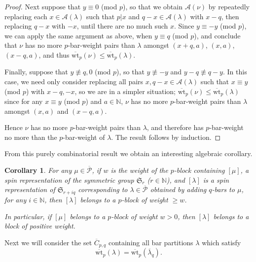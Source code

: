 \documentclass[10pt]{amsart}
\newtheorem{coro}[prop]{Corollary}
\begin{document}
\begin{proof}
Next suppose that $y\equiv0$ (mod $p$), so that we obtain $\mathcal{A}(\nu)$ by repeatedly replacing each $x\in\mathcal{A}(\lambda)$ such that $p|x$ and $q-x\in\mathcal{A}(\lambda)$ with $x-q$, then replacing $q-x$ with $-x$, until there are no much such $x$. Since $y\equiv-y$ (mod $p$), we can apply the same argument as above, when $y\equiv q$ (mod $p$), and conclude that $\nu$ has no more $p$-bar-weight pairs than $\lambda$ amongst $(x+q,a)$, $(x,a)$, $(x-q,a)$, and thus $\overline{\text{wt}}_p(\nu)\leq\overline{\text{wt}}_p(\lambda)$. 

Finally, suppose that $y\not\equiv q,0$ (mod $p$), so that $y\not\equiv-y$ and $y-q\not\equiv q-y$. In this case, we need only consider replacing all pairs $x,q-x\in\mathcal{A}(\lambda)$ such that $x\equiv y$ (mod $p$) with $x-q,-x$, so we are in a simpler situation; $\overline{\text{wt}}_p(\nu)\leq\overline{\text{wt}}_p(\lambda)$ since for any $x\equiv y$ (mod $p$) and $a\in\mathbb{N}$, $\nu$ has no more $p$-bar-weight pairs than $\lambda$ amongst $(x,a)$ and $(x-q,a)$.

Hence $\nu$ has no more $p$-bar-weight pairs than $\lambda$, and therefore has $p$-bar-weight no more than the $p$-bar-weight of $\lambda$. The result follows by induction.
\end{proof}

From this purely combinatorial result we obtain an interesting algebraic corollary. 

\begin{coro}For any $\mu\in\overline{\mathcal{P}}$, if $w$ is the weight of the $p$-block containing $[\mu]$, a spin representation of the symmetric group $\mathfrak{S}_r$ ($r\in\mathbb{N}$), and $[\lambda]$ is a spin representation of $\mathfrak{S}_{r+iq}$ corresponding to $\lambda\in\overline{\mathcal{P}}$ obtained by adding $q$-bars to $\mu$, for any $i\in\mathbb{N}$, then $[\lambda]$ belongs to a $p$-block of weight $\geq w$. 

In particular, if $[\mu]$ belongs to a $p$-block of weight $w>0$, then $[\lambda]$ belongs to a block of positive weight. 
\end{coro}

Next we will consider the set $\overline{C}_{p,q}$ containing all bar partitions $\lambda$ which satisfy 
$$\overline{\text{wt}}_p(\lambda)=\overline{\text{wt}}_p(\overline{\lambda}_q).$$
\end{document}
